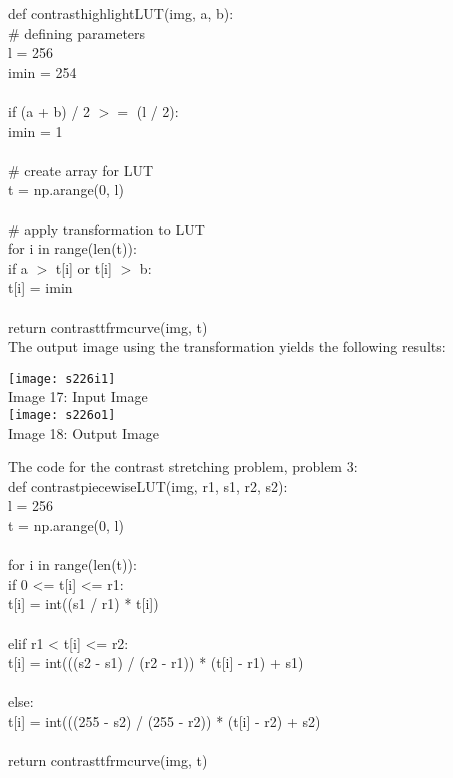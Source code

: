 \documentclass{article}
\begin{document}
	\noindent def contrast\textunderscore highlight\textunderscore LUT(img, a, b):\\
	\indent \# defining parameters\\
	\indent l = 256\\
	\indent i\textunderscore min = 254\\
	\\
	\indent if (a + b) / 2 $ > = $ (l / 2):\\
	\indent \indent i\textunderscore min = 1\\
	\\
	\indent \# create array for LUT\\
	\indent t = np.arange(0, l)\\
	\\
	\indent \# apply transformation to LUT\\
	\indent for i in range(len(t)):\\
	\indent \indent if a $ > $ t[i] or t[i] $ > $ b:\\
	\indent \indent \indent t[i] = i\textunderscore min\\
	\\
	\indent return contrast\textunderscore tfrm\textunderscore curve(img, t)\\
	
	The output image using the transformation yields the following results:\\
	
	\begin{center}
		\noindent \texttt{[image: s226i1]}\\
		Image 17: Input Image\\
		\texttt{[image: s226o1]}\\
		Image 18: Output Image\\
	\end{center}
	
	The code for the contrast stretching problem, problem 3:\\
	
	\noindent def contrast\textunderscore piecewise\textunderscore LUT(img, r1, s1, r2, s2):\\
	\indent l = 256\\
	\indent t = np.arange(0, l)\\
	\\
	\indent for i in range(len(t)):\\
	\indent \indent if 0 <= t[i] <= r1:\\
	\indent \indent \indent t[i] = int((s1 / r1) * t[i])\\
	\\
	\indent \indent elif r1 < t[i] <= r2:\\
	\indent \indent \indent t[i] = int(((s2 - s1) / (r2 - r1)) * (t[i] - r1) + s1)\\
	\\
	\indent \indent else:\\
	\indent \indent \indent t[i] = int(((255 - s2) / (255 - r2)) * (t[i] - r2) + s2)\\
	\\
	\indent return contrast\textunderscore tfrm\textunderscore curve(img, t)\\
	
\end{document}
